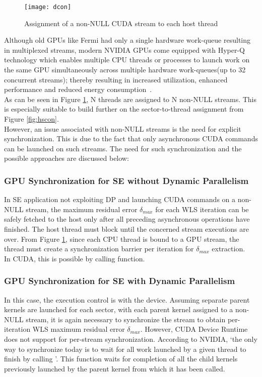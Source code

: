 \documentclass[thesis.tex]{subfiles}
\begin{document}
\begin{figure}[H]
	\centering
	\texttt{[image: dcon]}
	\caption{Assignment of a non-NULL CUDA stream to each host thread}
	\label{fig:dcon}
\end{figure}

Although old GPUs like Fermi had only a single hardware work-queue resulting in multiplexed streams, modern NVIDIA GPUs come equipped with Hyper-Q technology which enables multiple CPU threads or processes to launch work on the same GPU simultaneously across multiple hardware work-queues(up to 32 concurrent streams); thereby resulting in increased utilization, enhanced performance and reduced energy consumption~\cite{Luley}. \\

As can be seen in Figure \ref{fig:dcon}, N threads are assigned to N non-NULL streams. This is especially suitable to build further on the sector-to-thread assignment from Figure \ref{fig:hscon}.\\
However, an issue associated with non-NULL streams is the need for explicit synchronization. This is due to the fact that only asynchronous CUDA commands can be launched on such streams. The need for such synchronization and the possible approaches are discussed below:

\subsubsection{GPU Synchronization for SE without Dynamic Parallelism}
In SE application not exploiting DP and launching CUDA commands on a non-NULL stream, the maximum residual error $\delta_{max}$ for each WLS iteration can be safely fetched to the host only after all preceding asynchronous operations have finished. The host thread must block until the concerned stream executions are over. From Figure \ref{fig:dcon}, since each CPU thread is bound to a GPU stream, the thread must create a synchronization barrier per iteration for  $\delta_{max}$ extraction. \\In CUDA, this is possible by calling  function.


\subsubsection{GPU Synchronization for SE with Dynamic Parallelism}
In this case, the execution control is with the device. Assuming separate parent kernels are launched for each sector, with each parent kernel assigned to a non-NULL stream, it is again necessary to synchronize the stream to obtain per-iteration WLS maximum residual error $\delta_{max}$. However, CUDA Device Runtime does not support  for per-stream synchronization. According to NVIDIA, ‘the only way to synchronize today is to wait for all work launched by a given thread to finish by calling ’. This function waits for completion of all the child kernels previously launched by the parent kernel from which it has been called.
\end{document}
